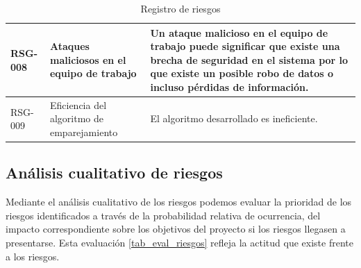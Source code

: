 \begin{table}[htpb]
\begin{tabularx}{\textwidth}{|l|X|X|}
RSG-008                             & Ataques maliciosos en el equipo de trabajo         & Un ataque malicioso en el equipo de trabajo puede significar que existe una brecha de seguridad en el sistema por lo que existe un posible robo de datos o incluso pérdidas de información. \\ \hline
RSG-009                             & Eficiencia del algoritmo de emparejamiento         & El algoritmo desarrollado es ineficiente. \\ \hline
\end{tabularx}
\caption{Registro de riesgos}
\label{tab_reg_riesgos}
\end{table}

\subsection{Análisis cualitativo de riesgos}
Mediante el análisis cualitativo de los riesgos podemos evaluar la prioridad de los riesgos identificados a través de la probabilidad relativa de ocurrencia, del impacto correspondiente sobre los objetivos del proyecto si los riesgos llegasen a presentarse. Esta evaluación \ref{tab_eval_riesgos} refleja la actitud que existe frente a los riesgos. 


